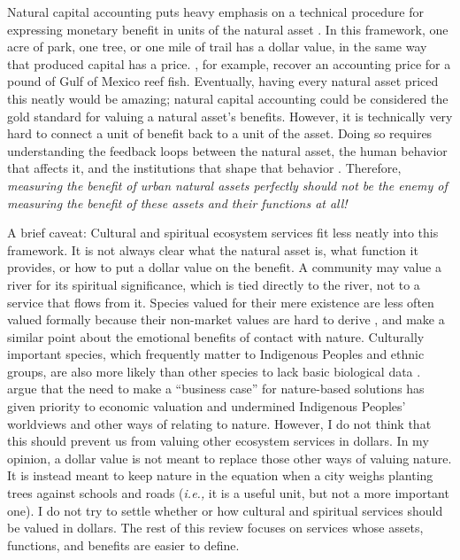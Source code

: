 \documentclass[12pt]{article}
\begin{document}
Natural capital accounting puts heavy emphasis on a technical procedure for expressing monetary benefit in units of the natural asset \citep{fenichelMeasuringValueGroundwater2016, fenichelNewEra2024}. In this framework, one acre of park, one tree, or one mile of trail has a dollar value, in the same way that produced capital has a price. \citet{fenichelNaturalCapitalMetaphor2014}, for example, recover an accounting price for a pound of Gulf of Mexico reef fish. Eventually, having every natural asset priced this neatly would be amazing; natural capital accounting could be considered the gold standard for valuing a natural asset's benefits. However, it is technically very hard to connect a unit of benefit back to a unit of the asset. Doing so requires understanding the feedback loops between the natural asset, the human behavior that affects it, and the institutions that shape that behavior \citep{fenichelNewEra2024}. Therefore, \textit{measuring the benefit of urban natural assets perfectly should not be the enemy of measuring the benefit of these assets and their functions at all!} 

A brief caveat: Cultural and spiritual ecosystem services fit less neatly into this framework. It is not always clear what the natural asset is, what function it provides, or how to put a dollar value on the benefit. A community may value a river for its spiritual significance, which is tied directly to the river, not to a service that flows from it. Species valued for their mere existence are less often valued formally because their non-market values are hard to derive \citep{maher_economics_2020}, and \citet{boydWhatAreEcosystem2007} make a similar point about the emotional benefits of contact with nature. Culturally important species, which frequently matter to Indigenous Peoples and ethnic groups, are also more likely than other species to lack basic biological data \citep{reyes-garcia_biocultural_2023}. \citet{diepEmpoweringCitiesGlobally2025} argue that the need to make a ``business case'' for nature-based solutions has given priority to economic valuation and undermined Indigenous Peoples' worldviews and other ways of relating to nature. However, I do not think that this should prevent us from valuing other ecosystem services in dollars. In my opinion, a dollar value is not meant to replace those other ways of valuing nature. It is instead meant to keep nature in the equation when a city weighs planting trees against schools and roads (\textit{i.e.,} it is a useful unit, but not a more important one). I do not try to settle whether or how cultural and spiritual services should be valued in dollars. The rest of this review focuses on services whose assets, functions, and benefits are easier to define.
\end{document}
